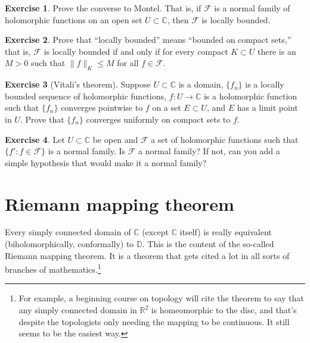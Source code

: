 \documentclass[12pt,openany]{book}
\newcommand{\snorm}[1]{\lVert {#1} \rVert}
\newcommand{\C}{{\mathbb{C}}}
\newcommand{\R}{{\mathbb{R}}}
\newcommand{\D}{{\mathbb{D}}}
\newcommand{\sF}{{\mathscr{F}}}
\theoremstyle{plain}
\theoremstyle{remark}
\theoremstyle{definition}
\newenvironment{exbox}{%
    \def\FrameCommand{\vrule width 1pt \relax\hspace{10pt}}%
    \MakeFramed{\advance\hsize-\width\FrameRestore}%
}{%
    \endMakeFramed
}
\theoremstyle{exercise}
\newtheorem{exercise}{Exercise}[section]
\theoremstyle{example}
\begin{document}
\begin{exbox}
\begin{exercise}
Prove the converse to Montel.  That is, if $\sF$ is a normal family of 
holomorphic functions on an open set $U \subset \C$, then $\sF$ is locally
bounded.
\end{exercise}

\begin{exercise}
Prove that ``locally bounded'' means ``bounded on compact sets,''
that is, $\sF$ is locally bounded if and only if
for every compact $K \subset U$ there is an $M >0$ such that
$\snorm{f}_K \leq M$ for all $f \in \sF$.
\end{exercise}

\begin{exercise}[Vitali's theorem]
Suppose $U \subset \C$ is a domain, $\{ f_n \}$ is a locally bounded
sequence of holomorphic functions, $f \colon U \to \C$ is a holomorphic
function such that $\{ f_n \}$ converges pointwise to $f$ on a set $E \subset U$,
and $E$ has a limit point in $U$.  Prove that $\{ f_n \}$
converges uniformly on compact sets to $f$.
\end{exercise}

\begin{exercise}
Let $U \subset \C$ be open and $\sF$ a set of holomorphic
functions such that $\{ f' : f \in \sF \}$ is a normal family.
Is $\sF$ a normal family?  If not, can you add a simple
hypothesis that would make it a normal family?
\end{exercise}
\end{exbox}


\section{Riemann mapping theorem}
\label{sec:RMT}

Every simply connected domain of $\C$ (except $\C$ itself) is really
equivalent (biholomorphically, conformally) to $\D$.
This is the content of the so-called Riemann mapping theorem.
It is a theorem that gets cited a lot in all sorts of branches of
mathematics.\footnote{For example, a beginning course on topology will cite
the theorem to say that any simply connected domain in $\R^2$
is homeomorphic to the disc, and that's despite the topologists only
needing the mapping to be continuous.  It still seems to be the easiest way.}
\end{document}
